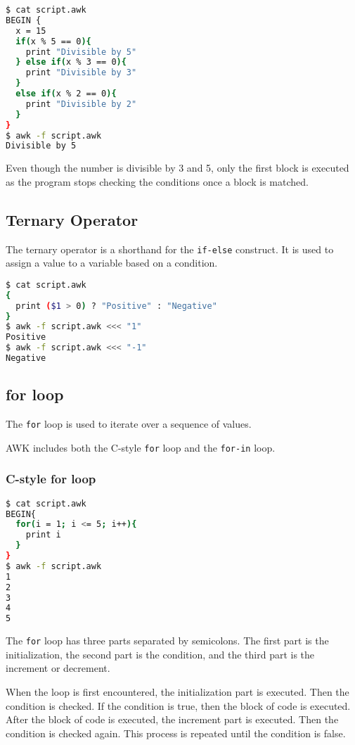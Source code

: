 \begin{lstlisting}[language=bash]
$ cat script.awk
BEGIN {
  x = 15
  if(x % 5 == 0){
    print "Divisible by 5"
  } else if(x % 3 == 0){
    print "Divisible by 3"
  }
  else if(x % 2 == 0){
    print "Divisible by 2"
  }
}
$ awk -f script.awk
Divisible by 5
\end{lstlisting}

Even though the number is divisible by 3 and 5, only the first block is executed as the program stops checking the conditions once a block is matched.

\subsection{Ternary Operator}

The ternary operator is a shorthand for the \lstinline|if-else| construct. It is used to assign a value to a variable based on a condition.

\begin{lstlisting}[language=bash]
$ cat script.awk
{
  print ($1 > 0) ? "Positive" : "Negative"
}
$ awk -f script.awk <<< "1"
Positive
$ awk -f script.awk <<< "-1"
Negative
\end{lstlisting}

\subsection{for loop}

The \lstinline|for| loop is used to iterate over a sequence of values. 

AWK includes both the C-style \lstinline|for| loop and the \lstinline|for-in| loop.

\subsubsection{C-style for loop}

\begin{lstlisting}[language=bash]
$ cat script.awk
BEGIN{
  for(i = 1; i <= 5; i++){
    print i
  }
}
$ awk -f script.awk
1
2
3
4
5
\end{lstlisting}

The \lstinline|for| loop has three parts separated by semicolons. The first part is the initialization, the second part is the condition, and the third part is the increment or decrement.

When the loop is first encountered, the initialization part is executed. Then the condition is checked. If the condition is true, then the block of code is executed. After the block of code is executed, the increment part is executed. Then the condition is checked again. This process is repeated until the condition is false.

